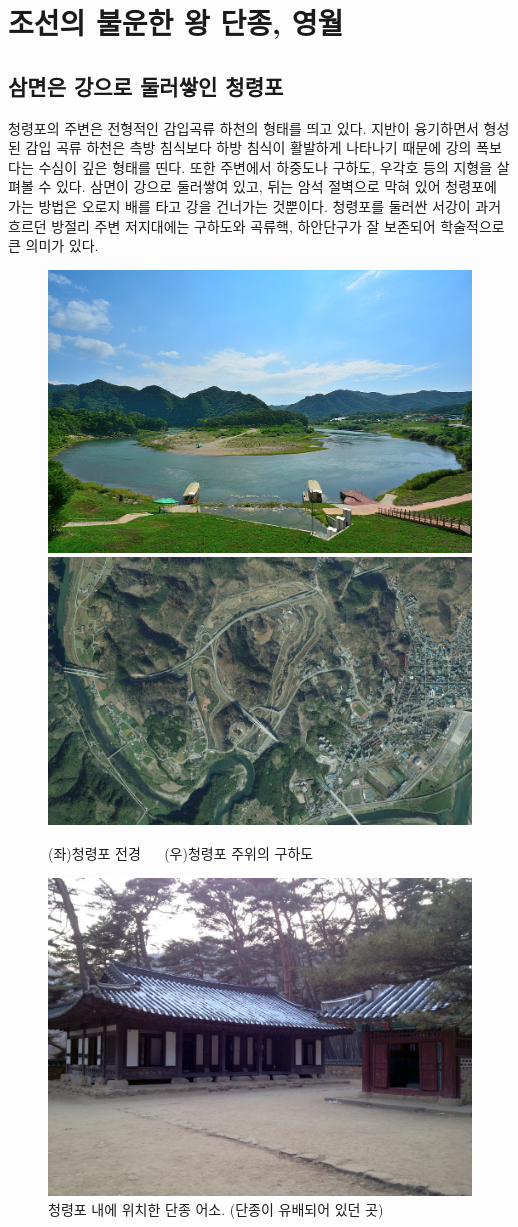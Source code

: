 \section{조선의 불운한 왕 단종, 영월}
\subsection{삼면은 강으로 둘러쌓인 청령포}
청령포의 주변은 전형적인 감입곡류 하천의 형태를 띄고 있다. 
지반이 융기하면서 형성된 감입 곡류 하천은 측방 침식보다 하방 침식이 활발하게 나타나기 때문에 강의 폭보다는 수심이 깊은 형태를 띤다. 
또한 주변에서 하중도나 구하도, 우각호 등의 지형을 살펴볼 수 있다. 삼면이 강으로 둘러쌓여 있고, 
뒤는 암석 절벽으로 막혀 있어 청령포에 가는 방법은 오로지 배를 타고 강을 건너가는 것뿐이다. 
청령포를 둘러싼 서강이 과거 흐르던 방절리 주변 저지대에는 구하도와 곡류핵, 하안단구가 잘 보존되어 학술적으로 큰 의미가 있다.


\begin{figure}
    \centering
    \includegraphics[width=.4\textwidth]{s_img/청령포_사진.jpeg}
    \includegraphics[width=.4\textwidth]{s_img/청령포_구하도.png}
    \caption{(좌)청령포 전경 $\quad$ (우)청령포 주위의 구하도\protect\footnotemark}
    \label{fig:my_label_s3}
 \end{figure}

 
\begin{figure}
    \centering
    \includegraphics[width=.6\textwidth]{s_img/청령포_사진_2.JPG}
    \caption{청령포 내에 위치한 단종 어소. (단종이 유배되어 있던 곳) \protect\footnotemark}
    \label{fig:my_label_s31}
\end{figure}


